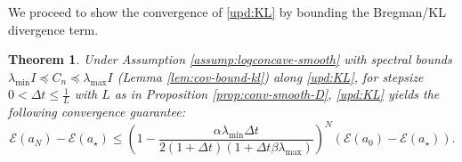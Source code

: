 \documentclass[11pt]{article}
\theoremstyle{plain}
\newtheorem{theorem}{Theorem}[section]
\theoremstyle{definition}
\theoremstyle{remark}
\begin{document}
We proceed to show the convergence of \eqref{upd:KL} by bounding the Bregman/KL divergence term.

\begin{theorem}\label{thm:conv-KL}
    Under Assumption \ref{assump:logconcave-smooth} with spectral bounds $\lambda_{\min} I \preceq C_n \preceq \lambda_{\max} I$ (Lemma \ref{lem:cov-bound-kl}) along \eqref{upd:KL}, for stepsize $0 < \Delta t \leq \frac{1}{L}$ with $L$ as in Proposition \ref{prop:conv-smooth-D}, \eqref{upd:KL} yields the following convergence guarantee:
    \begin{equation*}
        \mathcal{E} (a_N) - \mathcal{E} (a_\star) \leq \left(1 - \frac{\alpha\lambda_{\min} \Delta t}{2 (1 + \Delta t) (1 + \Delta t \beta \lambda_{\max})} \right)^N (\mathcal{E} (a_0) - \mathcal{E} (a_\star)).
    \end{equation*}
\end{theorem}
\end{document}
